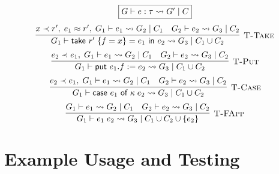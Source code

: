 \begin{figure}
    \centering
    \[
        \fbox{$G \vdash e : \tau \rightsquigarrow G'\; |\; C$}
    \]
    \[
        \infer[\textsc{T-Take}]{
            G_1 \vdash \textsf{take } r'\; \{ f = x \} = e_1 \textsf{ in } e_2
                \rightsquigarrow G_3\; |\; C_1 \cup C_2
        }{
            x \tlt r',\; e_1 \teq r',\; G_1 \vdash e_1 \rightsquigarrow G_2\; |\; C_1
            \hspace{1em}
            G_2 \vdash e_2 \rightsquigarrow G_3\; |\; C_2
        }
    \]
    \[
        \infer[\textsc{T-Put}]{
            G_1 \vdash \textsf{put } e_1.f := e_2
                \rightsquigarrow G_3\; |\; C_1 \cup C_2
        }{
            e_2 \tlt e_1,\; G_1 \vdash e_1 \rightsquigarrow G_2\; |\; C_1
            \hspace{1em}
            G_2 \vdash e_2 \rightsquigarrow G_3\; |\; C_2
        }
    \]
    \[
        \infer[\textsc{T-Case}]{
            G_1 \vdash \textsf{case } e_1 \textsf{ of } \kappa\; e_2
                \rightsquigarrow G_3\; |\; C_1 \cup C_2
        }{
            e_2 \tlt e_1,\; G_1 \vdash e_1 \rightsquigarrow G_2\; |\; C_1
            \hspace{1em}
            G_2 \vdash e_2 \rightsquigarrow G_3\; |\; C_2
        }
    \]
    \[
        \infer[\textsc{T-FApp}]{
            G_1 \vdash e_1\; e_2
                \rightsquigarrow G_3\; |\; C_1 \cup C_2 \cup \{e_2\}
        }{
            G_1 \vdash e_1 \rightsquigarrow G_2\; |\; C_1
            \hspace{1em}
            G_2 \vdash e_2 \rightsquigarrow G_3\; |\; C_2
        }
    \]

    \caption{}
    \label{fig:terminationassertiongen}
\end{figure}


\pagebreak
\section{Example Usage and Testing}
